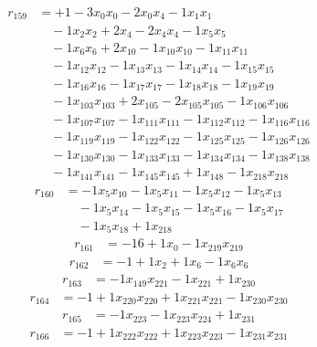 \[\begin{aligned}
r_{159} &= + 1 - 3 x_{0} x_{0} - 2 x_{0} x_{4} - 1 x_{1} x_{1} \\
 &\quad - 1 x_{2} x_{2} + 2 x_{4} - 2 x_{4} x_{4} - 1 x_{5} x_{5} \\
 &\quad - 1 x_{6} x_{6} + 2 x_{10} - 1 x_{10} x_{10} - 1 x_{11} x_{11} \\
 &\quad - 1 x_{12} x_{12} - 1 x_{13} x_{13} - 1 x_{14} x_{14} - 1 x_{15} x_{15} \\
 &\quad - 1 x_{16} x_{16} - 1 x_{17} x_{17} - 1 x_{18} x_{18} - 1 x_{19} x_{19} \\
 &\quad - 1 x_{103} x_{103} + 2 x_{105} - 2 x_{105} x_{105} - 1 x_{106} x_{106} \\
 &\quad - 1 x_{107} x_{107} - 1 x_{111} x_{111} - 1 x_{112} x_{112} - 1 x_{116} x_{116} \\
 &\quad - 1 x_{119} x_{119} - 1 x_{122} x_{122} - 1 x_{125} x_{125} - 1 x_{126} x_{126} \\
 &\quad - 1 x_{130} x_{130} - 1 x_{133} x_{133} - 1 x_{134} x_{134} - 1 x_{138} x_{138} \\
 &\quad - 1 x_{141} x_{141} - 1 x_{145} x_{145} + 1 x_{148} - 1 x_{218} x_{218}
\end{aligned}\]
\[\begin{aligned}
r_{160} &= - 1 x_{5} x_{10} - 1 x_{5} x_{11} - 1 x_{5} x_{12} - 1 x_{5} x_{13} \\
 &\quad - 1 x_{5} x_{14} - 1 x_{5} x_{15} - 1 x_{5} x_{16} - 1 x_{5} x_{17} \\
 &\quad - 1 x_{5} x_{18} + 1 x_{218}
\end{aligned}\]
\[\begin{aligned}
r_{161} &= - 16 + 1 x_{0} - 1 x_{219} x_{219}
\end{aligned}\]
\[\begin{aligned}
r_{162} &= - 1 + 1 x_{2} + 1 x_{6} - 1 x_{6} x_{6}
\end{aligned}\]
\[\begin{aligned}
r_{163} &= - 1 x_{149} x_{221} - 1 x_{221} + 1 x_{230}
\end{aligned}\]
\[\begin{aligned}
r_{164} &= - 1 + 1 x_{220} x_{220} + 1 x_{221} x_{221} - 1 x_{230} x_{230}
\end{aligned}\]
\[\begin{aligned}
r_{165} &= - 1 x_{223} - 1 x_{223} x_{224} + 1 x_{231}
\end{aligned}\]
\[\begin{aligned}
r_{166} &= - 1 + 1 x_{222} x_{222} + 1 x_{223} x_{223} - 1 x_{231} x_{231}
\end{aligned}\]
